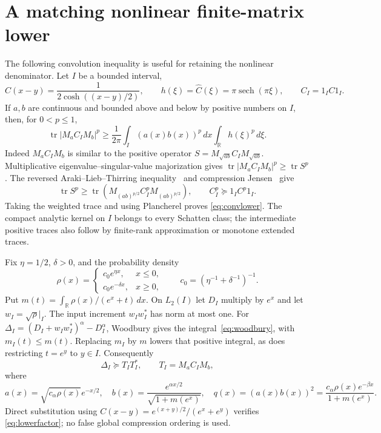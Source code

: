 \documentclass[11pt]{article}
\numberwithin{equation}{section}
\newcommand{\tr}{\operatorname{tr}}
\newcommand{\R}{\mathbb R}
\newcommand{\sech}{\operatorname{sech}}
\begin{document}
\section{A matching nonlinear finite-matrix lower}

The following convolution inequality is useful for retaining the
nonlinear denominator. Let $I$ be a bounded interval,
\[
 C(x-y)=\frac1{2\cosh((x-y)/2)},\qquad
 h(\xi)=\widehat C(\xi)=\pi\sech(\pi\xi),\qquad
 C_I=1_I C1_I.
\]
If $a,b$ are continuous and bounded above and below by positive
numbers on $I$, then, for $0<p\le1$,
\begin{equation}\label{eq:convlower}
 \tr|M_aC_IM_b|^p\ge\frac1{2\pi}
           \int_I(a(x)b(x))^p\,dx\int_\R h(\xi)^p\,d\xi.
\end{equation}
Indeed $M_aC_IM_b$ is similar to the positive operator
$S=M_{\sqrt{ab}}C_IM_{\sqrt{ab}}$. Multiplicative eigenvalue--singular-value
majorization gives $\tr|M_aC_IM_b|^p\ge\tr S^p$.
The reversed Araki--Lieb--Thirring inequality~\cite{ALT} and
compression Jensen~\cite{HP} give
\[
 \tr S^p\ge\tr(M_{(ab)^{p/2}}C_I^pM_{(ab)^{p/2}}),\qquad
 C_I^p\succeq1_I C^p1_I.
\]
Taking the weighted trace and using Plancherel proves
\eqref{eq:convlower}. The compact analytic kernel on $I$ belongs
to every Schatten class; the intermediate positive traces also
follow by finite-rank approximation or monotone extended traces.

Fix $\eta=1/2$, $\delta>0$, and the probability density
\begin{equation}\label{eq:density}
 \rho(x)=\begin{cases}c_0e^{\eta x},&x\le0,\\
                      c_0e^{-\delta x},&x\ge0,
        \end{cases}\qquad
 c_0=(\eta^{-1}+\delta^{-1})^{-1}.
\end{equation}
Put $m(t)=\int_\R\rho(x)/(e^x+t)\,dx$. On $L_2(I)$ let $D_I$
multiply by $e^x$ and let $w_I=\sqrt\rho|_I$. The input increment
$w_Iw_I^*$ has norm at most one. For
$\Delta_I=(D_I+w_Iw_I^*)^\alpha-D_I^\alpha$, Woodbury gives the
integral~\eqref{eq:woodbury}, with $m_I(t)\le m(t)$.
Replacing $m_I$ by $m$ lowers that positive integral, as does
restricting $t=e^y$ to $y\in I$. Consequently
\begin{equation}\label{eq:lowerfactor}
 \Delta_I\succeq T_IT_I^*,\qquad
 T_I=M_aC_IM_b,
\end{equation}
where
\[
 a(x)=\sqrt{c_\alpha\rho(x)}e^{-x/2},\quad
 b(x)=\frac{e^{\alpha x/2}}{\sqrt{1+m(e^x)}},\quad
 q(x)=(a(x)b(x))^2
       =\frac{c_\alpha\rho(x)e^{-\beta x}}{1+m(e^x)}.
\]
Direct substitution using
$C(x-y)=e^{(x+y)/2}/(e^x+e^y)$ verifies
\eqref{eq:lowerfactor}; no false global compression ordering is used.
\end{document}
